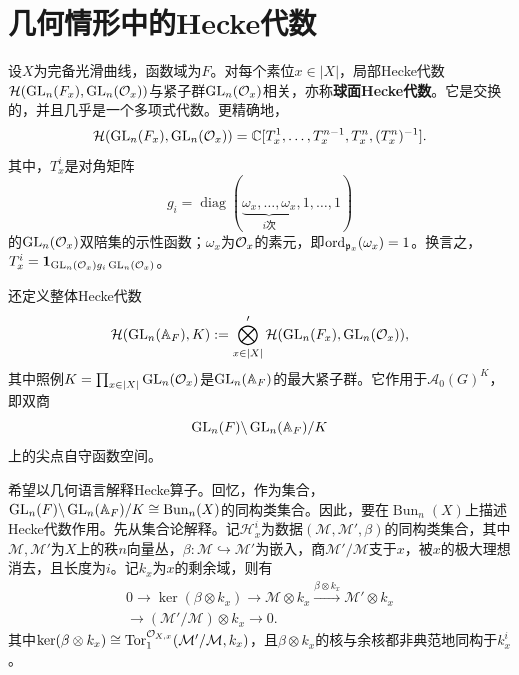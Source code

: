 \section{几何情形中的Hecke代数}\label{L12S1}
设$X$为完备光滑曲线，函数域为$F$。对每个素位$x\in|X|$，局部Hecke代数$\mathcal H(\operatorname{GL}_n(F_x),\operatorname{GL}_n(\mathcal O_x))$与紧子群$\operatorname{GL}_n(\mathcal O_x)$相关，亦称\textbf{球面Hecke代数}。它是交换的，并且几乎是一个多项式代数。更精确地，
\[\mathcal H(\operatorname{GL}_n(F_x),\operatorname{GL}_n(\mathcal O_x))=\mathbb{C}[T_x^1,\ldots,T_x^{n-1},T_x^n,(T_x^n)^{-1}].\]
其中，$T_x^i$是对角矩阵
\[g_i=\operatorname{diag}(\underbrace{\omega_x,\ldots,\omega_x}_{i\text{次}},1,\ldots,1)\]
的$\operatorname{GL}_n(\mathcal O_x)$双陪集的示性函数；$\omega_x$为$\mathcal O_x$的素元，即$\operatorname{ord}_{\mathfrak{p}_x}(\omega_x)=1$。换言之，$T_x^i=\mathbf1_{\operatorname{GL}_n(\mathcal O_x)g_i\operatorname{GL}_n(\mathcal O_x)}$。

还定义整体Hecke代数
\[\mathcal H(\operatorname{GL}_n(\mathbb{A}_F),K):=\bigotimes_{x\in|X|}'\mathcal H(\operatorname{GL}_n(F_x),\operatorname{GL}_n(\mathcal O_x)),\]
其中照例$K=\prod_{x\in|X|}\operatorname{GL}_n(\mathcal O_x)$是$\operatorname{GL}_n(\mathbb{A}_F)$的最大紧子群。它作用于$\mathcal A_0(G)^K$，即双商
\[\operatorname{GL}_n(F)\backslash\operatorname{GL}_n(\mathbb{A}_F)/K\]
上的尖点自守函数空间。

希望以几何语言解释Hecke算子。回忆，作为集合，$\operatorname{GL}_n(F)\backslash\operatorname{GL}_n(\mathbb{A}_F)/K\cong\operatorname{Bun}_n(X)$的同构类集合。因此，要在$\operatorname{Bun}_n(X)$上描述Hecke代数作用。先从集合论解释。记$\mathcal H_x^i$为数据$(\mathcal M,\mathcal M',\beta)$的同构类集合，其中$\mathcal M,\mathcal M'$为$X$上的秩$n$向量丛，$\beta:\mathcal M\hookrightarrow\mathcal M'$为嵌入，商$\mathcal M'/\mathcal M$支于$x$，被$x$的极大理想消去，且长度为$i$。记$k_x$为$x$的剩余域，则有
\begin{equation}\tag{1.1}\label{L12eq11}
\begin{aligned}
0\to\ker(\beta\otimes k_x)\to\mathcal M\otimes k_x\xrightarrow{\beta\otimes k_x}\mathcal M'\otimes k_x\\
\longrightarrow(\mathcal M'/\mathcal M)\otimes k_x\to0.
\end{aligned}
\end{equation}
其中$\ker(\beta\otimes k_x)\cong\operatorname{Tor}^{\mathcal O_{X,x}}_1(\mathcal M'/\mathcal M,k_x)$，且$\beta\otimes k_x$的核与余核都非典范地同构于$k_x^i$。

